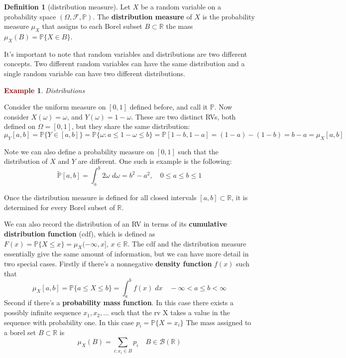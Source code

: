 \documentclass[11pt]{article}
\theoremstyle{definition}
\theoremstyle{definition}
\newcommand{\R}[0]{\mathbb{R}}
\theoremstyle{definition}
\newtheorem{definition}{\textcolor{OliveGreen}{Definition}}
\newtheorem{ex}{\textcolor{Maroon}{Example}}
\theoremstyle{remark}
\begin{document}
\begin{definition}[distribution measure]
    Let $X$ be a random variable on a probability space $(\Omega, \mathcal{F}, \mathbb{P})$. The \textbf{distribution measure}
    of $X$ is the probability measure $\mu_X$ that assigns to each Borel subset $B \subset \R$ the mass
    $\mu_X(B) = \mathbb{P}\{X \in B\}$.
\end{definition}

It's important to note that random variables and distributions are two different concepts. Two different random variables
can have the same distribution and a single random variable can have two different distributions.

\begin{ex} \textit{Distributions}
    
    Consider the uniform measure on $[0, 1]$ defined before, and call it $\mathbb{P}$. Now consider $X(\omega) = \omega$,
    and $Y(\omega) = 1- \omega$. These are two distinct RVs, both defined on $\Omega = [0, 1]$, but they share the same
    distribution:
    \[
        \mu_Y[a,b] = \mathbb{P}\{Y \in [a, b]\} = \mathbb{P}\{\omega : a \leq 1 - \omega \leq b\} = \mathbb{P}[1 - b, 1- a]
        = (1 - a) - (1 - b) = b - a = \mu_X[a,b]
    \]    

    Note we can also define a probability measure on $[0, 1]$ such that the distribution of $X$ and $Y$ are different.
    One such is example is the following:
    \[
        \tilde{\mathbb{P}}[a, b] = \int_a^b 2 \omega \; d\omega = b^2 - a^2, \quad 0 \leq a \leq b \leq 1
    \]   
\end{ex}
Once the distribution measure is defined for all closed intervals $[a, b] \subset \R$, it is determined for 
every Borel subset of $\R$.  

We can also record the distribution of an RV in terms of its \textbf{cumulative distribution function} (cdf), which
is defined as $F(x) = \mathbb{P}\{X \leq x\} = \mu_X(-\infty, x]$, $x \in \R$. The cdf and the distribution measure
essentially give the same amount of information, but we can have more detail in two special cases. Firstly
if there's a nonnegative \textbf{density function} $f(x)$ such that 
\[
    \mu_X[a,b] = \mathbb{P}\{a \leq X \leq b\} = \int_a^b f(x) \; dx \quad -\infty < a \leq b < \infty
\] 
Second if there's a \textbf{probability mass function}. In this case there exists a possibly infinite sequence
$x_1, x_2, \dots$ such that the rv X takes a value in the sequence with probability one. In this case $p_i = \mathbb{P}\{X = x_i\}$ 
The mass assigned to a borel set $B \subset \R$ is 
\[
    \mu_X(B) = \sum_{i : x_i \in B} p_i \quad B \in \mathcal{B}(\R)
\]   
\end{document}
